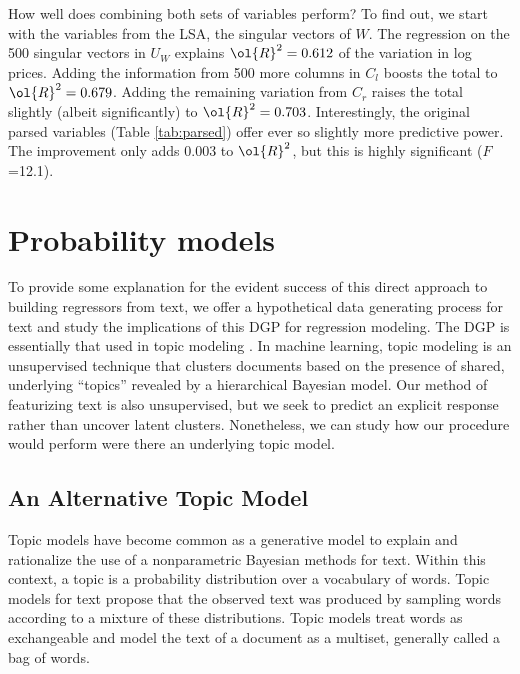 \documentclass[10pt]{article}
\begin{document}
How well does combining both sets of variables perform?  To find out, we start with the variables from the LSA, the singular vectors of $W$.   The regression on the 500 singular vectors in $U_W$ explains $\ol{R}^2 = 0.612$ of the variation in log prices.  Adding the information from 500 more columns in $C_l$ boosts the total to $\ol{R}^2 = 0.679$.  Adding the remaining variation from $C_r$ raises the total slightly (albeit significantly) to $\ol{R}^2 = 0.703$. Interestingly,  the original parsed variables (Table \ref{tab:parsed}) offer ever so slightly more predictive power. The improvement only adds 0.003 to $\ol{R}^2$, but this is highly significant ($F$=12.1).


\section{Probability models}
\label{sec:topicmodels}

 To provide some explanation for the evident success of this direct approach to building regressors from text, we offer a hypothetical data generating process for text and study the implications of this DGP for regression modeling.  The DGP is essentially that used in topic modeling \citep{blei12}.  In machine learning, topic modeling is an unsupervised technique that  clusters documents based on the presence of shared, underlying ``topics'' revealed by a hierarchical Bayesian  model.  Our method of featurizing text is also unsupervised,  but we seek to predict an explicit response rather than uncover latent clusters.  Nonetheless, we can study how our procedure would perform were there an underlying topic model.

\subsection{ An Alternative Topic Model } %

Topic models have become common as a generative model to explain and rationalize the use of a nonparametric Bayesian methods for text.  Within this context, a topic is a probability distribution over a vocabulary of words.  Topic models for text propose that the observed text was produced by sampling words according to a mixture of these distributions. Topic models treat words as exchangeable and model the text of a document as a multiset, generally called a bag of words.
\end{document}
